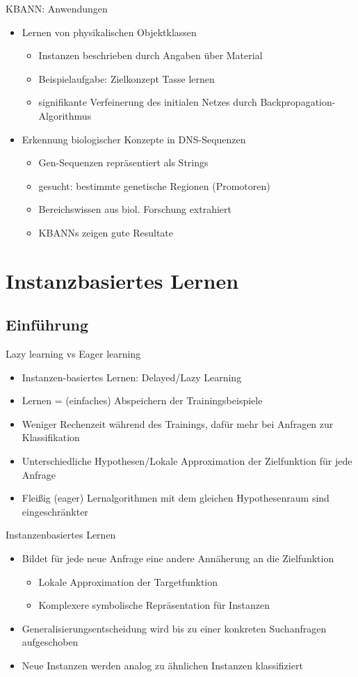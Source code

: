 \documentclass[paper=a4, fontsize=11pt]{scrartcl} %
\numberwithin{equation}{section} %
\numberwithin{figure}{section} %
\numberwithin{table}{section} %
\begin{document}
KBANN: Anwendungen
\begin{itemize}
\item Lernen von physikalischen Objektklassen
\begin{itemize}
\item Instanzen beschrieben durch Angaben über Material
\item Beispielaufgabe: Zielkonzept Tasse lernen
\item signifikante Verfeinerung des initialen Netzes durch Backpropagation-Algorithmus
\end{itemize}
\item Erkennung biologischer Konzepte in DNS-Sequenzen
\begin{itemize}
\item Gen-Sequenzen repräsentiert als Strings
\item gesucht: bestimmte genetische Regionen (Promotoren)
\item Bereichswissen aus biol. Forschung extrahiert
\item KBANNs zeigen gute Resultate
\end{itemize}
\end{itemize}

\section{Instanzbasiertes Lernen}

\subsection{Einführung}

Lazy learning vs Eager learning
\begin{itemize}
\item Instanzen-basiertes Lernen: Delayed/Lazy Learning
\item Lernen = (einfaches) Abspeichern der Trainingsbeispiele
\item Weniger Rechenzeit während des Trainings, dafür mehr bei Anfragen zur Klassifikation
\item Unterschiedliche Hypothesen/Lokale Approximation der Zielfunktion für jede Anfrage
\item Fleißig (eager) Lernalgorithmen mit dem gleichen Hypothesenraum sind eingeschränkter
\end{itemize}

Instanzenbasiertes Lernen
\begin{itemize}
\item Bildet für jede neue Anfrage eine andere Annäherung an die Zielfunktion
\begin{itemize}
\item Lokale Approximation der Targetfunktion
\item Komplexere symbolische Repräsentation für Instanzen
\end{itemize}
\item Generalisierungsentscheidung wird bis zu einer konkreten Suchanfragen aufgeschoben
\item Neue Instanzen werden analog zu ähnlichen Instanzen klassifiziert
\end{itemize}
\end{document}
